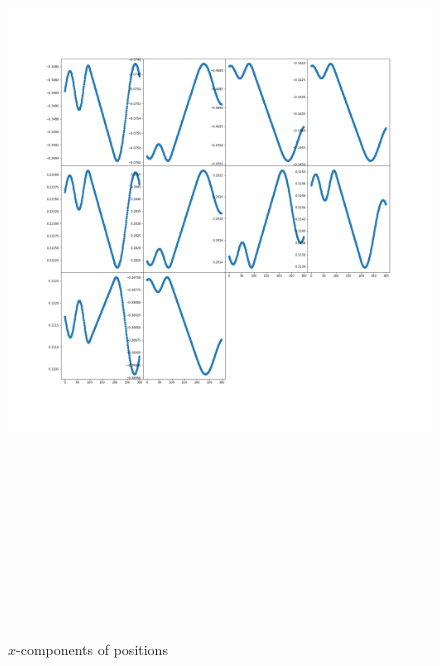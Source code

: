 \documentclass[12pt]{article}
\begin{document}
	\begin{figure}[H]
		\includegraphics[width=\linewidth, height=22cm]{subpsx3.png} \caption{$x$-components of positions} \label{subpsx3}
	\end{figure}
\end{document}
